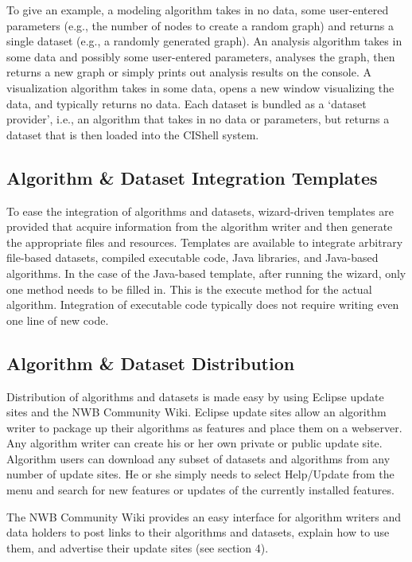To give an example, a modeling algorithm takes in no data, some user-entered 
parameters (e.g., the number of nodes to create a random graph) and returns a 
single dataset (e.g., a randomly generated graph). An analysis algorithm takes 
in some data and possibly some user-entered parameters, analyses the graph, 
then returns a new graph or simply prints out analysis results on the console. 
A visualization algorithm takes in some data, opens a new window visualizing 
the data, and typically returns no data. Each dataset is bundled as a ‘dataset 
provider’, i.e.,  an algorithm that takes in no data or parameters, but returns 
a dataset that is then loaded into the CIShell system.

\subsection{Algorithm \& Dataset Integration Templates}

To ease the integration of algorithms and datasets, wizard-driven templates are 
provided that acquire information from the algorithm writer and then generate 
the appropriate files and resources. Templates are available to integrate 
arbitrary file-based datasets, compiled executable code, Java libraries, and 
Java-based algorithms. In the case of the Java-based template, after running 
the wizard, only one method needs to be filled in. This is the execute method for 
the actual algorithm. Integration of executable code typically does not require 
writing even one line of new code.

\subsection{Algorithm \& Dataset Distribution}

Distribution of algorithms and datasets is made easy by using 
Eclipse \cite{eclipse} update sites and the NWB Community Wiki. Eclipse update 
sites allow an algorithm writer to package up their algorithms as features and 
place them on a webserver. Any algorithm writer can create his or her own 
private or public update site. Algorithm users can download any subset of 
datasets and algorithms from any number of update sites. He or she simply needs 
to select Help/Update from the menu and search for new features or updates of 
the currently installed features.

The NWB Community Wiki provides an easy interface for algorithm writers and data 
holders to post links to their algorithms and datasets, explain how to use 
them, and advertise their update sites (see section 4).

